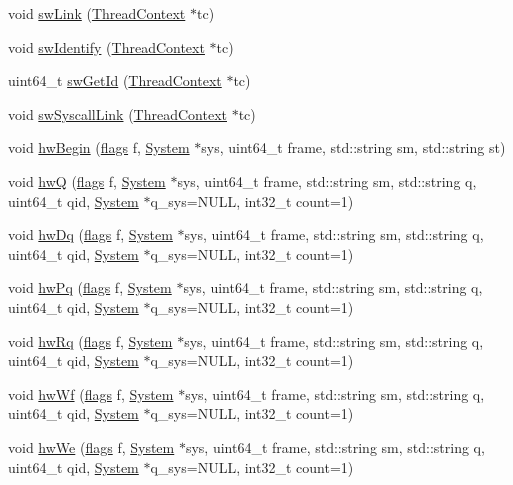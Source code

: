 \begin{DoxyCompactItemize}
\item 
void \hyperlink{classCPA_ac7cc79e85798fb591b3969babfcf988c}{swLink} (\hyperlink{classThreadContext}{ThreadContext} $\ast$tc)
\item 
void \hyperlink{classCPA_a50a4bcd54d92400f9e5ddbf0acfdc7a0}{swIdentify} (\hyperlink{classThreadContext}{ThreadContext} $\ast$tc)
\item 
uint64\_\-t \hyperlink{classCPA_a22857436177616b92bb58196ae977955}{swGetId} (\hyperlink{classThreadContext}{ThreadContext} $\ast$tc)
\item 
void \hyperlink{classCPA_ae18020f070546bb9bc4f695bd55670be}{swSyscallLink} (\hyperlink{classThreadContext}{ThreadContext} $\ast$tc)
\item 
void \hyperlink{classCPA_adaf891d4f8327c0311472739f4a2235b}{hwBegin} (\hyperlink{classCPA_ab6b306ef981f5e21bb41ea2c2dbe8cd9}{flags} f, \hyperlink{classSystem}{System} $\ast$sys, uint64\_\-t frame, std::string sm, std::string st)
\item 
void \hyperlink{classCPA_a31614725ede04f43ff983d5dedb56590}{hwQ} (\hyperlink{classCPA_ab6b306ef981f5e21bb41ea2c2dbe8cd9}{flags} f, \hyperlink{classSystem}{System} $\ast$sys, uint64\_\-t frame, std::string sm, std::string q, uint64\_\-t qid, \hyperlink{classSystem}{System} $\ast$q\_\-sys=NULL, int32\_\-t count=1)
\item 
void \hyperlink{classCPA_ac6ac43bd87dec93efd50230427086a92}{hwDq} (\hyperlink{classCPA_ab6b306ef981f5e21bb41ea2c2dbe8cd9}{flags} f, \hyperlink{classSystem}{System} $\ast$sys, uint64\_\-t frame, std::string sm, std::string q, uint64\_\-t qid, \hyperlink{classSystem}{System} $\ast$q\_\-sys=NULL, int32\_\-t count=1)
\item 
void \hyperlink{classCPA_af8e1db0d850fba66449e84c9387c2fca}{hwPq} (\hyperlink{classCPA_ab6b306ef981f5e21bb41ea2c2dbe8cd9}{flags} f, \hyperlink{classSystem}{System} $\ast$sys, uint64\_\-t frame, std::string sm, std::string q, uint64\_\-t qid, \hyperlink{classSystem}{System} $\ast$q\_\-sys=NULL, int32\_\-t count=1)
\item 
void \hyperlink{classCPA_abfcac9cc80c2bd60bafb7da3f6669ba6}{hwRq} (\hyperlink{classCPA_ab6b306ef981f5e21bb41ea2c2dbe8cd9}{flags} f, \hyperlink{classSystem}{System} $\ast$sys, uint64\_\-t frame, std::string sm, std::string q, uint64\_\-t qid, \hyperlink{classSystem}{System} $\ast$q\_\-sys=NULL, int32\_\-t count=1)
\item 
void \hyperlink{classCPA_a5f67bcd321d7d3535e71a61c71fbd304}{hwWf} (\hyperlink{classCPA_ab6b306ef981f5e21bb41ea2c2dbe8cd9}{flags} f, \hyperlink{classSystem}{System} $\ast$sys, uint64\_\-t frame, std::string sm, std::string q, uint64\_\-t qid, \hyperlink{classSystem}{System} $\ast$q\_\-sys=NULL, int32\_\-t count=1)
\item 
void \hyperlink{classCPA_a5b3ce310c0911ec7bca22bc32f243cb9}{hwWe} (\hyperlink{classCPA_ab6b306ef981f5e21bb41ea2c2dbe8cd9}{flags} f, \hyperlink{classSystem}{System} $\ast$sys, uint64\_\-t frame, std::string sm, std::string q, uint64\_\-t qid, \hyperlink{classSystem}{System} $\ast$q\_\-sys=NULL, int32\_\-t count=1)
\end{DoxyCompactItemize}
